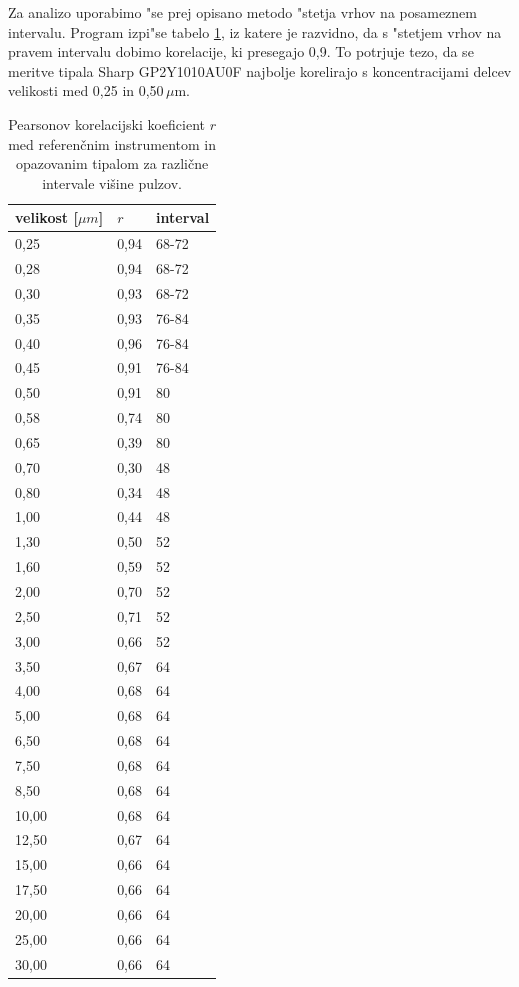 \documentclass[12pt,a4paper]{article}
\begin{document}
Za analizo uporabimo "se prej opisano metodo "stetja vrhov na posameznem intervalu. Program izpi"se tabelo \ref{table:correlations}, iz katere je razvidno, da s "stetjem vrhov na pravem intervalu dobimo korelacije, ki presegajo 0,9. To potrjuje tezo, da se meritve tipala Sharp GP2Y1010AU0F najbolje korelirajo s koncentracijami delcev velikosti med 0,25 in 0,50\,$\mu$m. 

\begin{table}[H]
	\centering
	\begin{tabular}{lll}
		velikost [$\mu m$] & $r$ & interval \\
		\hline
		0,25 & 0,94 & 68-72 \\
		0,28 & 0,94 & 68-72 \\
		0,30 & 0,93 & 68-72 \\
		0,35 & 0,93 & 76-84 \\
		0,40 & 0,96 & 76-84 \\
		0,45 & 0,91 & 76-84 \\
		0,50 & 0,91 & 80 \\
		0,58 & 0,74 & 80 \\
		0,65 & 0,39 & 80 \\
		0,70 & 0,30 & 48 \\
		0,80 & 0,34 & 48 \\
		1,00 & 0,44 & 48 \\
		1,30 & 0,50 & 52 \\
		1,60 & 0,59 & 52 \\
		2,00 & 0,70 & 52 \\
		2,50 & 0,71 & 52 \\
		3,00 & 0,66 & 52 \\
		3,50 & 0,67 & 64 \\
		4,00 & 0,68 & 64 \\
		5,00 & 0,68 & 64 \\
		6,50 & 0,68 & 64 \\
		7,50 & 0,68 & 64 \\
		8,50 & 0,68 & 64 \\
		10,00 & 0,68 & 64 \\
		12,50 & 0,67 & 64 \\
		15,00 & 0,66 & 64 \\
		17,50 & 0,66 & 64 \\
		20,00 & 0,66 & 64 \\
		25,00 & 0,66 & 64 \\
		30,00 & 0,66 & 64
		
	\end{tabular}
	\caption{Pearsonov korelacijski koeficient $r$ med referenčnim instrumentom in opazovanim tipalom za različne intervale višine pulzov.}
	\label{table:correlations}
	\def\arraystretch{1}
\end{table}
\end{document}

